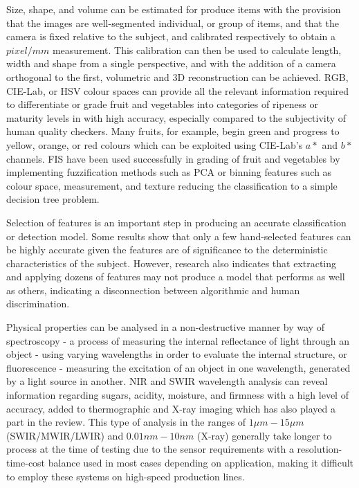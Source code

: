 \documentclass[fleqn,twoside,12pt]{report}
\begin{document}
Size, shape, and volume can be estimated for produce items with the provision that the images are well-segmented individual, or group of items, and that the camera is fixed relative to the subject, and calibrated respectively to obtain a $pixel/mm$ measurement. This calibration can then be used to calculate length, width and shape from a single perspective, and with the addition of a camera orthogonal to the first, volumetric and 3D reconstruction can be achieved. RGB, CIE-Lab, or HSV colour spaces can provide all the relevant information required to differentiate or grade fruit and vegetables into categories of ripeness or maturity levels in with high accuracy, especially compared to the subjectivity of human quality checkers. Many fruits, for example, begin green and progress to yellow, orange, or red colours which can be exploited using CIE-Lab's $a*$ and $b*$ channels. FIS have been used successfully in grading of fruit and vegetables by implementing fuzzification methods such as PCA or binning features such as colour space, measurement, and texture reducing the classification to a simple decision tree problem.  

Selection of features is an important step in producing an accurate classification or detection model. Some results show that only a few hand-selected features can be highly accurate given the features are of significance to the deterministic characteristics of the subject. However, research also indicates that extracting and applying dozens of features may not produce a model that performs as well as others, indicating a disconnection between algorithmic and human discrimination.

Physical properties can be analysed in a non-destructive manner by way of spectroscopy - a process of measuring the internal reflectance of light through an object - using varying wavelengths in order to evaluate the internal structure, or fluorescence - measuring the excitation of an object in one wavelength, generated by a light source in another. NIR and SWIR wavelength analysis can reveal information regarding sugars, acidity, moisture, and firmness with a high level of accuracy, added to thermographic and X-ray imaging which has also played a part in the review. This type of analysis in the ranges of $1\mu m-15\mu m$ (SWIR/MWIR/LWIR) and $0.01nm-10nm$ (X-ray) generally take longer to process at the time of testing due to the sensor requirements with a resolution-time-cost balance used in most cases depending on application, making it difficult to employ these systems on high-speed production lines.  
\end{document}
